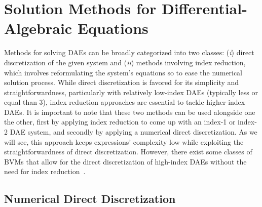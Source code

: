 
\section{Solution Methods for Differential-Algebraic Equations}

Methods for solving \acp{DAE} can be broadly categorized into two classes: (\emph{i}) direct discretization of the given system and (\emph{ii}) methods involving index reduction, which involves reformulating the system's equations so to ease the numerical solution process. While direct discretization is favored for its simplicity and straightforwardness, particularly with relatively low-index \acp{DAE} (typically less or equal than 3), index reduction approaches are essential to tackle higher-index \acp{DAE}. It is important to note that these two methods can be used alongside one the other, first by applying index reduction to come up with an index-1 or index-2 \ac{DAE} system, and secondly by applying a numerical direct discretization. As we will see, this approach keeps expressions' complexity low while exploiting the straightforwardness of direct discretization. However, there exist some classes of \acp{BVM} that allow for the direct discretization of high-index \acp{DAE} without the need for index reduction~\cite{amodio1993boundary, amodio1997parallel, amodio1998algorithm}.

\subsection{Numerical Direct Discretization}

